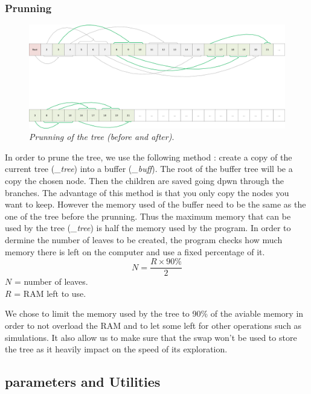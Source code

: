 \subsubsection{Prunning}
\begin{figure}[H] 
\centerline{\includegraphics[width=\textwidth]{Data_Structure/Img/array.png}}
\caption{\label{fig:arrayprunning}\textit{Prunning of the tree (before and after)}.}
\end{figure}
In order to prune the tree, we use the following method : create a copy of the current tree (\textit{\_tree}) into a buffer (\textit{\_buff}). The root of the buffer tree will be a copy the chosen node. Then the children are saved going dpwn through the branches. The advantage of this method is that you only copy the nodes you want to keep. However the memory used of the buffer need to be the same as the one of the tree before the prunning. Thus the maximum memory that can be used by the tree (\textit{\_tree}) is half the memory used by the program. In order to dermine the number of leaves to be created, the program checks how much memory there is left on the computer and use a fixed percentage of it.
\begin{equation}
N = \frac{R \times 90\%}{2}
\end{equation}
\ensuremath{N} = number of leaves.\\
\ensuremath{R} = RAM left to use.

We chose to limit the memory used by the tree to 90\% of the aviable memory in order to not overload the RAM and to let some left for other operations such as simulations. It also allow us to make sure that the swap won't be used to store the tree as it heavily impact on the speed of its exploration.
\newpage
\subsection{parameters and Utilities}
